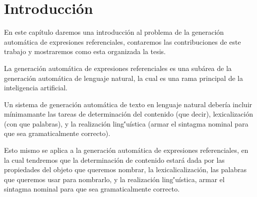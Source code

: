 \chapter{Introducci\'on}


En este cap\'itulo daremos una introducci\'on al problema de la generaci\'on autom\'atica de expresiones referenciales, contaremos las contribuciones de este trabajo y mostraremos como esta organizada la tesis.

La generaci\'on autom\'atica de expresiones referenciales es una sub\'area de la generaci\'on autom\'atica de lenguaje natural, la cual es una rama principal de la inteligencia artificial.

Un sistema de generaci\'on autom\'atica de texto en lenguaje natural deber\'ia incluir m\'inimamante 
las tareas de determinaci\'on del contenido (que decir), lexicalizaci\'on (con que palabras), y la realizaci\'on ling\''u\'istica (armar el  sintagma nominal para que sea gramaticalmente correcto). 

Esto mismo se aplica a la generaci\'on autom\'atica de expresiones referenciales, en la cual tendremos que la determinaci\'on de contenido estar\'a dada por las propiedades del objeto que queremos nombrar, la lexicalicalizaci\'on, las palabras que queremos usar para nombrarlo, y la realizaci\'on ling\''u\'istica, armar el sintagma nominal para que sea gramaticalmente correcto.

 





